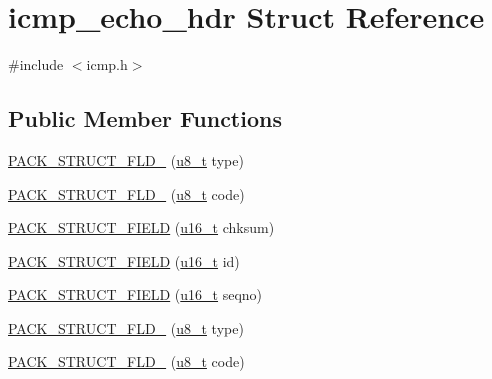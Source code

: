 \hypertarget{structicmp__echo__hdr}{}\section{icmp\+\_\+echo\+\_\+hdr Struct Reference}
\label{structicmp__echo__hdr}


{\ttfamily \#include $<$icmp.\+h$>$}

\subsection*{Public Member Functions}
\begin{DoxyCompactItemize}
\item 
\hyperlink{structicmp__echo__hdr_a0e52c238eaeadcb6f4fd9b8136488a66}{P\+A\+C\+K\+\_\+\+S\+T\+R\+U\+C\+T\+\_\+\+F\+L\+D\+\_} (\hyperlink{group__compiler__abstraction_ga4caecabca98b43919dd11be1c0d4cd8e}{u8\+\_\+t} type)
\item 
\hyperlink{structicmp__echo__hdr_adcbacb52889e263a973944ec5fbd6b55}{P\+A\+C\+K\+\_\+\+S\+T\+R\+U\+C\+T\+\_\+\+F\+L\+D\+\_} (\hyperlink{group__compiler__abstraction_ga4caecabca98b43919dd11be1c0d4cd8e}{u8\+\_\+t} code)
\item 
\hyperlink{structicmp__echo__hdr_a5d1bdfcc4a8bdd58513ecbaea368c1ad}{P\+A\+C\+K\+\_\+\+S\+T\+R\+U\+C\+T\+\_\+\+F\+I\+E\+LD} (\hyperlink{group__compiler__abstraction_ga77570ac4fcab86864fa1916e55676da2}{u16\+\_\+t} chksum)
\item 
\hyperlink{structicmp__echo__hdr_a35dd6758d625e1542599175e65235362}{P\+A\+C\+K\+\_\+\+S\+T\+R\+U\+C\+T\+\_\+\+F\+I\+E\+LD} (\hyperlink{group__compiler__abstraction_ga77570ac4fcab86864fa1916e55676da2}{u16\+\_\+t} id)
\item 
\hyperlink{structicmp__echo__hdr_a2d2722057bc87fa0afb495ba6716eb57}{P\+A\+C\+K\+\_\+\+S\+T\+R\+U\+C\+T\+\_\+\+F\+I\+E\+LD} (\hyperlink{group__compiler__abstraction_ga77570ac4fcab86864fa1916e55676da2}{u16\+\_\+t} seqno)
\item 
\hyperlink{structicmp__echo__hdr_a0e52c238eaeadcb6f4fd9b8136488a66}{P\+A\+C\+K\+\_\+\+S\+T\+R\+U\+C\+T\+\_\+\+F\+L\+D\+\_} (\hyperlink{group__compiler__abstraction_ga4caecabca98b43919dd11be1c0d4cd8e}{u8\+\_\+t} type)
\item 
\hyperlink{structicmp__echo__hdr_adcbacb52889e263a973944ec5fbd6b55}{P\+A\+C\+K\+\_\+\+S\+T\+R\+U\+C\+T\+\_\+\+F\+L\+D\+\_} (\hyperlink{group__compiler__abstraction_ga4caecabca98b43919dd11be1c0d4cd8e}{u8\+\_\+t} code)
\item 

\end{DoxyCompactItemize}
